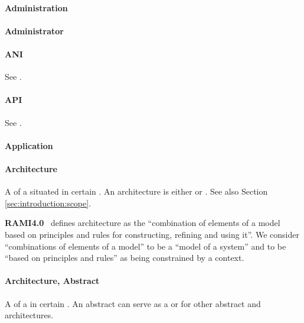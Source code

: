 %
%

{

\newcommand{\GlossaryEntry}[2]{\paragraph{#1}\label{sec:glossary:#2}}
\newcommand{\GlossarySourceNote}[2]{\begin{minipage}[b]{\dimexpr\linewidth-0.5cm\relax}\vspace*{0.33cm}\footnotesize{\textbf{#1}\ #2}\end{minipage}}

\GlossaryEntry{Administration}{administration}

\GlossaryEntry{Administrator}{administrator}

\GlossaryEntry{ANI}{ani}
See .

\GlossaryEntry{API}{api}
See .

\GlossaryEntry{Application}{application}

\GlossaryEntry{Architecture}{architecture}
A  of a  situated in certain .
An architecture is either  or .
See also Section \ref{sec:introduction:scope}.

	\GlossarySourceNote{RAMI4.0}{
	    defines architecture as the ``combination of elements of a model based on principles and rules for constructing, refining and using it''.
		We consider ``combinations of elements of a model'' to be a ``model of a system'' and to be ``based on principles and rules'' as being constrained by a context.
	}

\GlossaryEntry{Architecture, Abstract}{architecture-abstract}
A  of a  in certain .
An abstract  can serve as a  or  for other abstract and  architectures.

}
